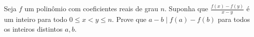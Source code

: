 Seja \(f\) um polinômio com coeficientes reais de grau \(n\). Suponha que \(\displaystyle \frac{f(x)-f(y)}{x-y}\) é um inteiro para todo \(0 \leq x<y \leq n\). Prove que \(a-b \mid f(a)-f(b)\) para todos os inteiros distintos \(a,b\).
